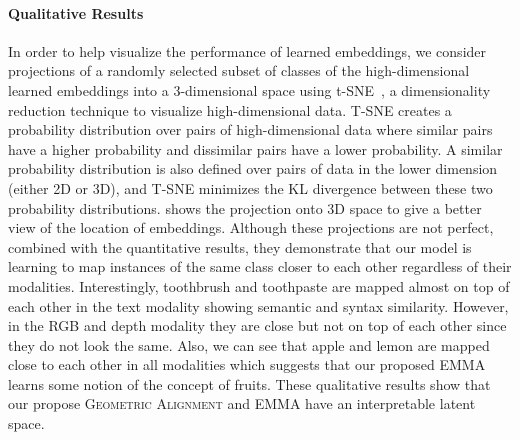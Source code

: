 \documentclass[10pt]{article} %
\newcommand{\ours}{\textsc{EMMA}}
\newcommand{\geom}{\textsc{Geometric Alignment}}
\begin{document}
\paragraph{Qualitative Results}
\label{sec:Qualitative}
In order to help visualize the performance of learned embeddings, we consider projections of a randomly selected subset of classes of the high-dimensional learned embeddings into a 3-dimensional space using t-SNE~\citep{van2008tsne}, a dimensionality reduction technique to visualize high-dimensional data. T-SNE creates a probability distribution over pairs of high-dimensional data where similar pairs have a higher probability and dissimilar pairs have a lower probability. A similar probability distribution is also defined over pairs of data in the lower dimension (either 2D or 3D), and T-SNE minimizes the KL divergence between these two probability distributions.
 shows the projection onto 3D space to give a better view of the location of embeddings. Although these projections are not perfect, combined with the quantitative results, they demonstrate that our model is learning to map instances of the same class closer to each other regardless of their modalities. Interestingly, toothbrush and toothpaste are mapped almost on top of each other in the text modality showing semantic and syntax similarity. However, in the RGB and depth modality they are close but not on top of each other since they do not look the same. Also, we can see that apple and lemon are mapped close to each other in all modalities which suggests that our proposed \ours{} learns some notion of the concept of fruits. These qualitative results show that our propose \geom{} and \ours{} have an interpretable latent space.
\end{document}
